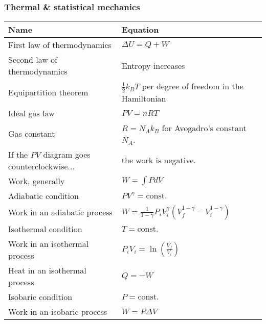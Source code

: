 \documentclass[11pt]{paper}
\begin{document}
\subsubsection*{Thermal \& statistical mechanics}
\label{subsec:tsm}
\label{my-label}
\bgroup
\def\arraystretch{2}
\begin{longtable}{ll}
\textbf{Name}       & \textbf{Equation}          \\ \hline
\multicolumn{1}{|l|}{First law of thermodynamics} & \multicolumn{1}{l|}{$\Delta U = Q+W$} \\ \hline
\multicolumn{1}{|l|}{Second law of thermodynamics} & \multicolumn{1}{l|}{Entropy increases} \\ \hline
\multicolumn{1}{|l|}{Equipartition theorem} & \multicolumn{1}{l|}{$\frac{1}{2}k_BT$ per degree of freedom in the Hamiltonian} \\ \hline
\multicolumn{1}{|l|}{Ideal gas law} & \multicolumn{1}{l|}{$PV=nRT$} \\ \hline
\multicolumn{1}{|l|}{Gas constant} & \multicolumn{1}{l|}{$R = N_A k_B$ for Avogadro's constant $N_A$.} \\ \hline
\multicolumn{1}{|l|}{If the $PV$ diagram goes counterclockwise...} & \multicolumn{1}{l|}{the work is negative.} \\ \hline
\multicolumn{1}{|l|}{Work, generally} & \multicolumn{1}{l|}{$W = \int P dV$} \\ \hline
\multicolumn{1}{|l|}{Adiabatic condition} & \multicolumn{1}{l|}{$PV^\gamma = \text{const.}$} \\ \hline
\multicolumn{1}{|l|}{Work in an adiabatic process} & \multicolumn{1}{l|}{$W = \frac{1}{1-\gamma}P_i V_i^{\gamma}\left(V_f^{1-\gamma}-V_i^{1-\gamma}\right)$} \\ \hline
\multicolumn{1}{|l|}{Isothermal condition} & \multicolumn{1}{l|}{$T = \text{const.}$} \\ \hline
\multicolumn{1}{|l|}{Work in an isothermal process} & \multicolumn{1}{l|}{$P_iV_i = \ln\left(\frac{V_f}{V_i}\right)$} \\ \hline
\multicolumn{1}{|l|}{Heat in an isothermal process} & \multicolumn{1}{l|}{$Q = -W$} \\ \hline
\multicolumn{1}{|l|}{Isobaric condition} & \multicolumn{1}{l|}{$P = \text{const.}$} \\ \hline
\multicolumn{1}{|l|}{Work in an isobaric process} & \multicolumn{1}{l|}{$W = P\Delta V$} \\ \hline

\end{longtable}
\end{document}
